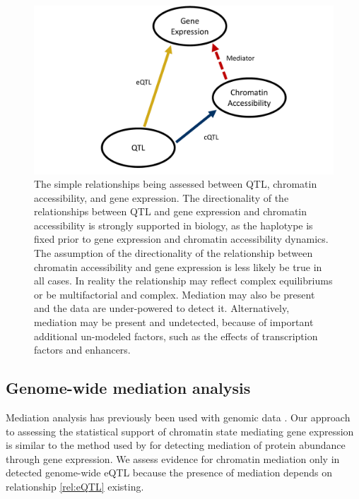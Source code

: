 \begin{figure}
\renewcommand{\familydefault}{\sfdefault}\normalfont
\centering
\includegraphics[width=\linewidth, clip, trim={0in 0 0 0in}]{figures/6-mediation/eQTL_cQTL_graph.pdf}
\caption[Simple model for mediation of eQTL effect on gene expression through chromatin accessibility]{The simple relationships being assessed between QTL, chromatin accessibility, and gene expression. The directionality of the relationships between QTL and gene expression and chromatin accessibility is strongly supported in biology, as the haplotype is fixed prior to gene expression and chromatin accessibility dynamics. The assumption of the directionality of the relationship between chromatin accessibility and gene expression is less likely be true in all cases. In reality the relationship may reflect complex equilibriums or be multifactorial and complex. Mediation may also be present and the data are under-powered to detect it. Alternatively, mediation may be present and undetected, because of important additional un-modeled factors, such as the effects of transcription factors and enhancers. \label{fig:graph}}
\end{figure}

\subsection{Genome-wide mediation analysis}

Mediation analysis has previously been used with genomic data \citep{Battle2014,Roytman2018,Wu2018}. Our approach to assessing the statistical support of chromatin state mediating gene expression is similar to the method used by \cite{Chick2016} for detecting mediation of protein abundance through gene expression. We assess evidence for chromatin mediation only in detected genome-wide eQTL because the presence of mediation depends on relationship \ref{rel:eQTL} existing.

